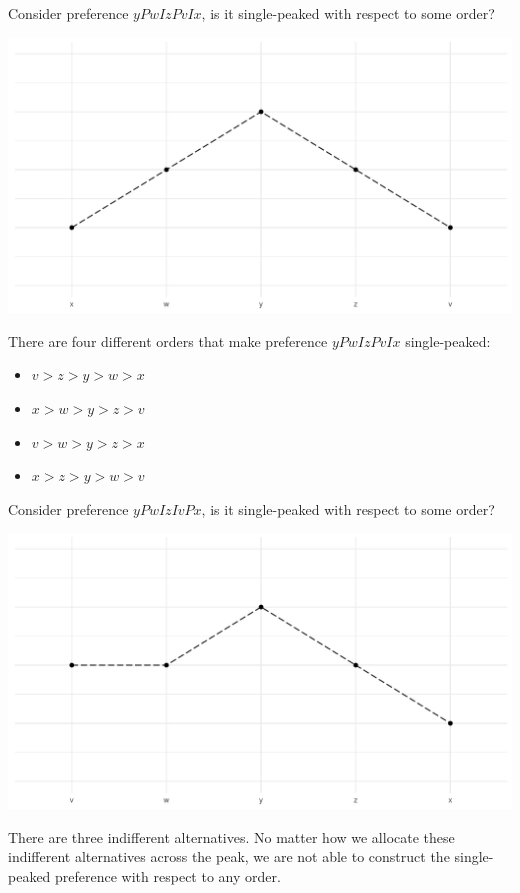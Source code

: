 \documentclass[a4paper]{article}
\begin{document}
Consider preference $yPwIzPvIx$, is it single-peaked with respect to some order?
\begin{center}
    \includegraphics[scale=0.5]{images/Ex3.5(b)1.pdf}
\end{center}

There are four different orders that make preference $yPwIzPvIx$ single-peaked:
\begin{itemize}
    \item $v>z>y>w>x$
    \item $x>w>y>z>v$
    \item $v>w>y>z>x$
    \item $x>z>y>w>v$
\end{itemize}


Consider preference $yPwIzIvPx$, is it single-peaked with respect to some order?
\begin{center}
    \includegraphics[scale=0.5]{images/Ex3.5(b)2.pdf}
\end{center}

There are three indifferent alternatives. No matter how we allocate these indifferent alternatives across the peak, we are not able to construct the single-peaked preference with respect to any order.
\end{document}

